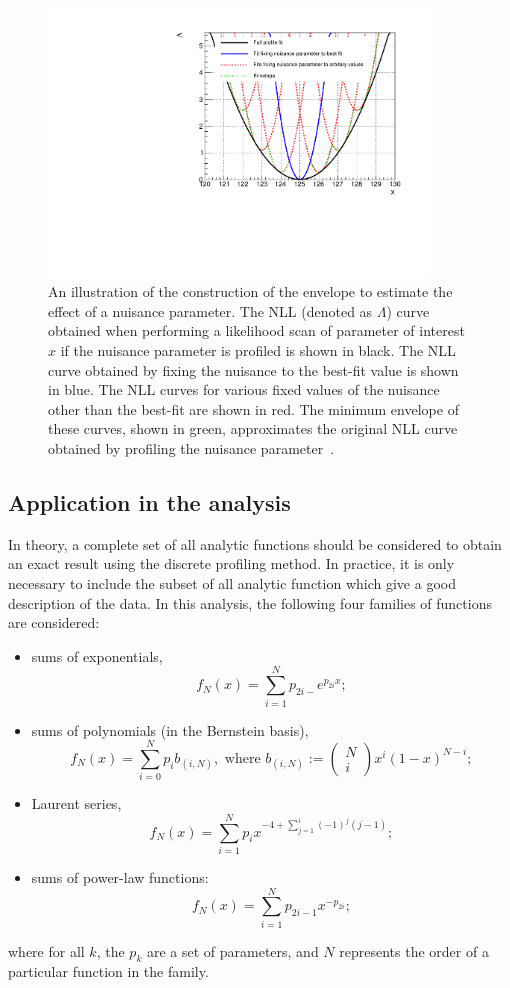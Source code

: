 \begin{figure}[ht!]
\centering
\includegraphics[width=0.9\textwidth]{modellingFigures/envelope_cartoon.pdf} 
\caption{An illustration of the construction of the envelope to estimate the effect of a nuisance parameter. The NLL (denoted as $\Lambda$) curve obtained when performing a likelihood scan of parameter of interest $x$ if the nuisance parameter is profiled is shown in black. The NLL curve obtained by fixing the nuisance to the best-fit value is shown in blue. The NLL curves for various fixed values of the nuisance other than the best-fit are shown in red. The minimum envelope of these curves, shown in green, approximates the original NLL curve obtained by profiling the nuisance parameter~\cite{DiscreteProfiling}.}

\label{fig:model:bkg_envelope}
\end{figure}

\subsection{Application in the \Hgg analysis}

In theory, a complete set of all analytic functions should be considered to obtain an exact result using the discrete profiling method. In practice, it is only necessary to include the subset of all analytic function which give a good description of the data. In this analysis, the following four families of functions are considered:

\begin{itemize}
\item sums of exponentials, $$ f_{N}(x)= \sum^{N}_{i=1} p_{2i-} e^{p_{2i} x} ;$$
\item sums of polynomials (in the Bernstein basis), $$ f_{N}(x) = \sum^{N}_{i=0} p_{i} b_{(i,N)}, \text{ where } b_{(i,N)}:= \begin{pmatrix} N \\ i \end{pmatrix} x^i (1-x)^{N-i} ;$$
\item Laurent series, $$ f_{N}(x)= \sum^{N}_{i=1} p_{i} x^{-4 + \sum^{i}_{j=1} (-1)^{j} (j-1)};$$
\item sums of power-law functions: $$ f_{N}(x)= \sum^{N}_{i=1} p_{2i-1} x^{-p_{2i}};$$
\end{itemize}
where for all $k$, the $p_k$ are a set of parameters, and $N$ represents the order of a particular function in the family. 

